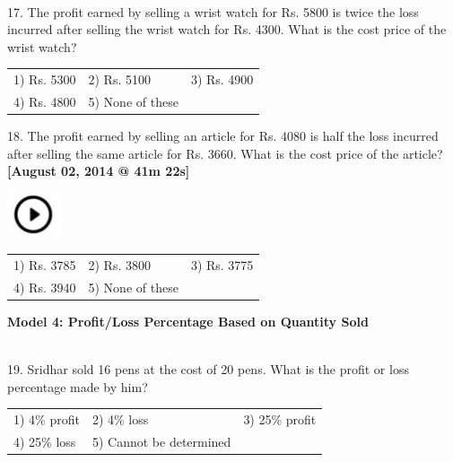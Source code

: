 \documentclass{article}
\begin{document}
	\noindent 
	
	\noindent 
	
	\noindent \\  17. The profit earned by selling a wrist watch for Rs. 5800 is twice the loss incurred after selling the wrist watch for Rs. 4300. What is the cost price of the wrist watch?
	
	\noindent \begin{tabular}{p{1.7in} p{1.6in} p{1.6in}} \\ 
 1) Rs. 5300                 & 2) Rs. 5100          & 3) Rs. 4900          \\
4) Rs. 4800          & 5) None of these \\
\end{tabular}
	
	\noindent 
	
	18. The profit earned by selling an article for Rs. 4080 is half the loss incurred after selling the same article for Rs. 3660. What is the cost price of the article?       \textbf{[August 02, 2014 @ 41m 22s]}
	
	\noindent \includegraphics*[width=0.60in, height=0.52in]{images/image1}
	\begin{tabular}{p{1.7in} p{1.6in} p{1.6in}} \\ 
 1) Rs. 3785                 & 2) Rs. 3800          & 3) Rs. 3775          \\
4) Rs. 3940          & 5) None of these \\
\end{tabular}
	
	\noindent 
	
	\noindent 
	
	\noindent \textbf{Model 4: Profit/Loss Percentage Based on Quantity Sold}
	
	\noindent 
	
	\noindent \\  19. Sridhar sold 16 pens at the cost of 20 pens. What is the profit or loss percentage made by him?
	
	\noindent \begin{tabular}{p{1.7in} p{1.6in} p{1.6in}} \\ 
 1) 4\% profit            & 2) 4\% loss        & 3) 25\% profit   \\
4) 25\% loss      & 5) Cannot be determined  \\
\end{tabular}
	
\end{document}
